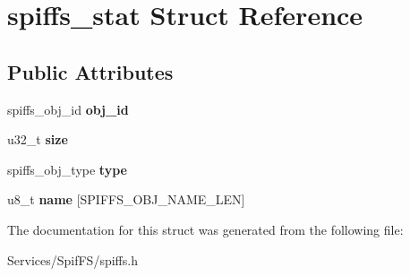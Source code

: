 \hypertarget{structspiffs__stat}{}\section{spiffs\+\_\+stat Struct Reference}
\label{structspiffs__stat}
\subsection*{Public Attributes}
\begin{DoxyCompactItemize}
\item 
\hypertarget{structspiffs__stat_a50f7d3e286b659e09498edf4e17f1daf}{}spiffs\+\_\+obj\+\_\+id {\bfseries obj\+\_\+id}\label{structspiffs__stat_a50f7d3e286b659e09498edf4e17f1daf}

\item 
\hypertarget{structspiffs__stat_a861b9a64014f77a01b9630278a7c2410}{}u32\+\_\+t {\bfseries size}\label{structspiffs__stat_a861b9a64014f77a01b9630278a7c2410}

\item 
\hypertarget{structspiffs__stat_ae08c958bb4b22fd9c6d576e1fea23685}{}spiffs\+\_\+obj\+\_\+type {\bfseries type}\label{structspiffs__stat_ae08c958bb4b22fd9c6d576e1fea23685}

\item 
\hypertarget{structspiffs__stat_a42b32d4cd1868c63f8a8598e5d888a8b}{}u8\+\_\+t {\bfseries name} \mbox{[}S\+P\+I\+F\+F\+S\+\_\+\+O\+B\+J\+\_\+\+N\+A\+M\+E\+\_\+\+L\+E\+N\mbox{]}\label{structspiffs__stat_a42b32d4cd1868c63f8a8598e5d888a8b}

\end{DoxyCompactItemize}


The documentation for this struct was generated from the following file\+:\begin{DoxyCompactItemize}
\item 
Services/\+Spif\+F\+S/spiffs.\+h\end{DoxyCompactItemize}
